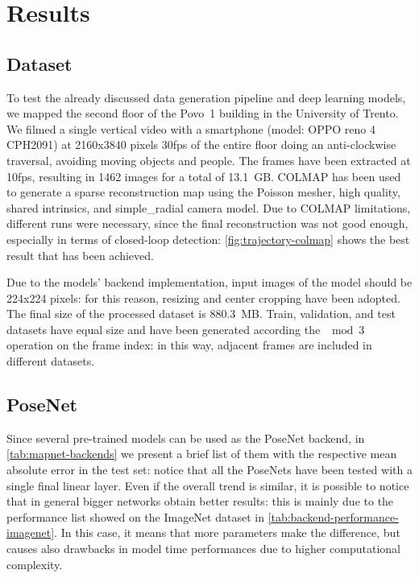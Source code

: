 \section{Results}

\subsection{Dataset}
To test the already discussed data generation pipeline and deep learning models, we mapped the second floor of the Povo~1 building in the University of Trento.
We filmed a single vertical video with a smartphone (model: OPPO reno 4 CPH2091) at 2160x3840 pixels 30fps of the entire floor doing an anti-clockwise traversal, avoiding moving objects and people. The frames have been extracted at 10fps, resulting in 1462 images for a total of 13.1 GB. COLMAP has been used to generate a sparse reconstruction map using the Poisson mesher, high quality, shared intrinsics, and simple\_radial camera model.
Due to COLMAP limitations, different runs were necessary, since the final reconstruction was not good enough, especially in terms of closed-loop detection: \cref{fig:trajectory-colmap} shows the best result that has been achieved.

Due to the models' backend implementation, input images of the model should be 224x224 pixels: for this reason, resizing and center cropping have been adopted. The final size of the processed dataset is 880.3 MB. Train, validation, and test datasets have equal size and have been generated according the $\mod{3}$ operation on the frame index: in this way, adjacent frames are included in different datasets.

\subsection{PoseNet}
Since several pre-trained models can be used as the PoseNet backend, in \cref{tab:mapnet-backends} we present a brief list of them with the respective mean absolute error in the test set: notice that all the PoseNets have been tested with a single final linear layer. Even if the overall trend is similar, it is possible to notice that in general bigger networks obtain better results: this is mainly due to the performance list showed on the ImageNet dataset in \cref{tab:backend-performance-imagenet}. In this case, it means that more parameters make the difference, but causes also drawbacks in model time performances due to higher computational complexity.

